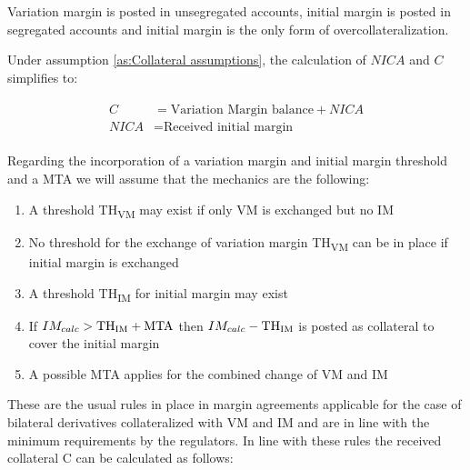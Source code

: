 \documentclass[../Thesis_AHoecherl.tex]{subfiles}
\begin{document}
\begin{assumption}\label{as:Collateral assumptions}
Variation margin is posted in unsegregated accounts, initial margin is posted in segregated accounts and initial margin is the only form of overcollateralization.
\end{assumption}

Under assumption \ref{as:Collateral assumptions}, the calculation of \(NICA\) and \(C\) simplifies to:

\begin{align}
	\begin{split}
		C&= \text{Variation Margin balance} + NICA\\ 
		NICA&= \text{Received initial margin}
	\end{split}
\end{align}

Regarding the incorporation of a variation margin and initial margin threshold and a MTA we will assume that the mechanics are the following:
\begin{enumerate}
	\item A threshold TH\textsubscript{VM} may exist if only VM is exchanged but no IM
	\item No threshold for the exchange of variation margin TH\textsubscript{VM} can be in place if initial margin is exchanged
	\item A threshold TH\textsubscript{IM} for initial margin may exist 
	\item If $ IM_{calc} > \text{TH\textsubscript{IM}} + \text{MTA} $ then $IM_{calc} - \text{TH\textsubscript{IM}} $ is posted as collateral to cover the initial margin
	\item A possible MTA applies for the combined change of VM and IM
\end{enumerate}

These are the usual rules in place in margin agreements applicable for the case of bilateral derivatives collateralized with VM and IM and are in line with the minimum requirements by the regulators.
In line with these rules the received collateral C can be calculated as follows:
\end{document}
